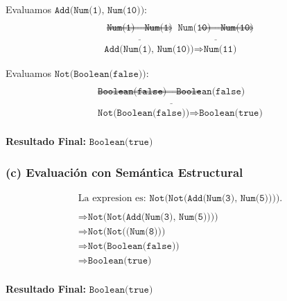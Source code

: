\documentclass[12pt,letterpaper]{article}
\begin{document}
Evaluamos \(\texttt{Add(Num(1), Num(10))}\):
\[
\begin{array}{c}
\\
\underline{\texttt{Num(1)} \Rightarrow \texttt{Num(1)}}
\underline{\texttt{Num(10)} \Rightarrow \texttt{Num(10)}} \\
\texttt{Add(Num(1), Num(10))} \Rightarrow \texttt{Num(11)}
\end{array}
\]

Evaluamos \(\texttt{Not(Boolean(false))}\):
\[
\begin{array}{c}
\\
\underline{\texttt{Boolean(false)} \Rightarrow \texttt{Boolean(false)}} \\
\texttt{Not(Boolean(false))} \Rightarrow \texttt{Boolean(true)} \\
\end{array}
\]

\textbf{Resultado Final:} \(\texttt{Boolean(true)}\)

\subsubsection*{(c) Evaluación con Semántica Estructural}

\[
\begin{array}{c}
\text{La expresion es: } \texttt{Not(Not(Add(Num(3), Num(5))))}. \\
\\
\Rightarrow \texttt{Not(Not(Add(Num(3), Num(5))))} \\
\Rightarrow \texttt{Not(Not((Num(8)))} \\
\Rightarrow \texttt{Not(Boolean(false))} \\
\Rightarrow \texttt{Boolean(true)} \\

\end{array}
\]

\textbf{Resultado Final:} \(\texttt{Boolean(true)}\)
\end{document}
